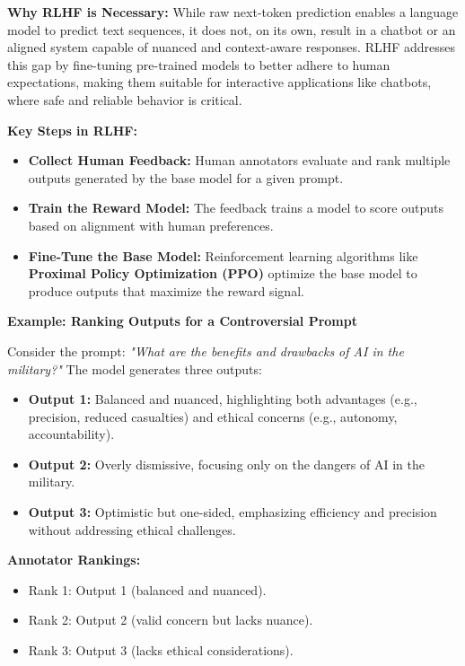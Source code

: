 \textbf{Why RLHF is Necessary:}
While raw next-token prediction enables a language model to predict text sequences, it does not, on its own, result in a chatbot or an aligned system capable of nuanced and context-aware responses. RLHF addresses this gap by fine-tuning pre-trained models to better adhere to human expectations, making them suitable for interactive applications like chatbots, where safe and reliable behavior is critical.

\textbf{Key Steps in RLHF:}
\begin{itemize}
    \item \textbf{Collect Human Feedback:} Human annotators evaluate and rank multiple outputs generated by the base model for a given prompt.
    \item \textbf{Train the Reward Model:} The feedback trains a model to score outputs based on alignment with human preferences.
    \item \textbf{Fine-Tune the Base Model:} Reinforcement learning algorithms like \textbf{Proximal Policy Optimization (PPO)} optimize the base model to produce outputs that maximize the reward signal.
\end{itemize}

\textbf{Example: Ranking Outputs for a Controversial Prompt}

Consider the prompt: \textit{"What are the benefits and drawbacks of AI in the military?"} The model generates three outputs:
\begin{itemize}
    \item \textbf{Output 1:} Balanced and nuanced, highlighting both advantages (e.g., precision, reduced casualties) and ethical concerns (e.g., autonomy, accountability).
    \item \textbf{Output 2:} Overly dismissive, focusing only on the dangers of AI in the military.
    \item \textbf{Output 3:} Optimistic but one-sided, emphasizing efficiency and precision without addressing ethical challenges.
\end{itemize}

\textbf{Annotator Rankings:}
\begin{itemize}
    \item Rank 1: Output 1 (balanced and nuanced).
    \item Rank 2: Output 2 (valid concern but lacks nuance).
    \item Rank 3: Output 3 (lacks ethical considerations).
\end{itemize}

